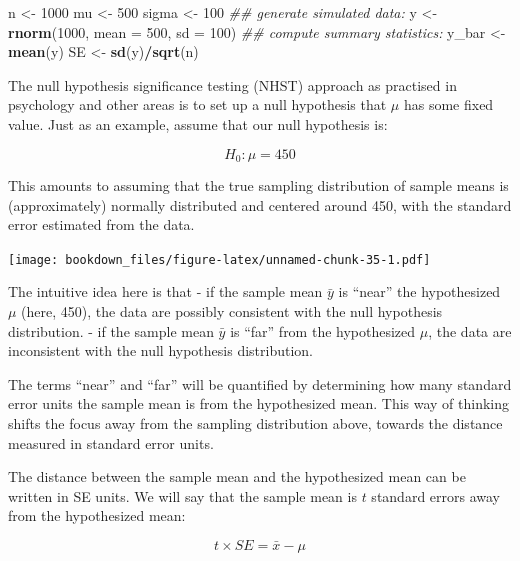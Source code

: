 \documentclass[12pt,]{krantz}
\newenvironment{Shaded}{\begin{snugshade}}{\end{snugshade}}
\newcommand{\CommentTok}[1]{\textcolor[rgb]{0.56,0.35,0.01}{\textit{#1}}}
\newcommand{\DataTypeTok}[1]{\textcolor[rgb]{0.13,0.29,0.53}{#1}}
\newcommand{\DecValTok}[1]{\textcolor[rgb]{0.00,0.00,0.81}{#1}}
\newcommand{\KeywordTok}[1]{\textcolor[rgb]{0.13,0.29,0.53}{\textbf{#1}}}
\newcommand{\NormalTok}[1]{#1}
\newcommand{\OperatorTok}[1]{\textcolor[rgb]{0.81,0.36,0.00}{\textbf{#1}}}
\newcommand{\StringTok}[1]{\textcolor[rgb]{0.31,0.60,0.02}{#1}}
\begin{document}
\begin{Shaded}
\begin{Highlighting}[]
\NormalTok{n <-}\StringTok{ }\DecValTok{1000}
\NormalTok{mu <-}\StringTok{ }\DecValTok{500}
\NormalTok{sigma <-}\StringTok{ }\DecValTok{100}
\CommentTok{## generate simulated data:}
\NormalTok{y <-}\StringTok{ }\KeywordTok{rnorm}\NormalTok{(}\DecValTok{1000}\NormalTok{, }\DataTypeTok{mean =} \DecValTok{500}\NormalTok{, }\DataTypeTok{sd =} \DecValTok{100}\NormalTok{)}
\CommentTok{## compute summary statistics:}
\NormalTok{y_bar <-}\StringTok{ }\KeywordTok{mean}\NormalTok{(y)}
\NormalTok{SE <-}\StringTok{ }\KeywordTok{sd}\NormalTok{(y)}\OperatorTok{/}\KeywordTok{sqrt}\NormalTok{(n)}
\end{Highlighting}
\end{Shaded}

The null hypothesis significance testing (NHST) approach as practised in psychology and other areas is to set up a null hypothesis that \(\mu\) has some fixed value. Just as an example, assume that our null hypothesis is:

\begin{equation}
H_0: \mu = 450
\end{equation}

This amounts to assuming that the true sampling distribution of sample means is (approximately) normally distributed and centered around 450, with the standard error estimated from the data.

\texttt{[image: bookdown\_files/figure-latex/unnamed-chunk-35-1.pdf]}

The intuitive idea here is that
- if the sample mean \(\bar{y}\) is ``near'' the hypothesized \(\mu\) (here, 450), the data are possibly consistent with the null hypothesis distribution.
- if the sample mean \(\bar{y}\) is ``far'' from the hypothesized \(\mu\), the data are inconsistent with the null hypothesis distribution.

The terms ``near'' and ``far'' will be quantified by determining how many standard error units the sample mean is from the hypothesized mean. This way of thinking shifts the focus away from the sampling distribution above, towards the distance measured in standard error units.

The distance between the sample mean and the hypothesized mean can be written in SE units. We will say that the sample mean is \(t\) standard errors away from the hypothesized mean:

\begin{equation}
t \times SE = \bar{x} - \mu 
\end{equation}
\end{document}
